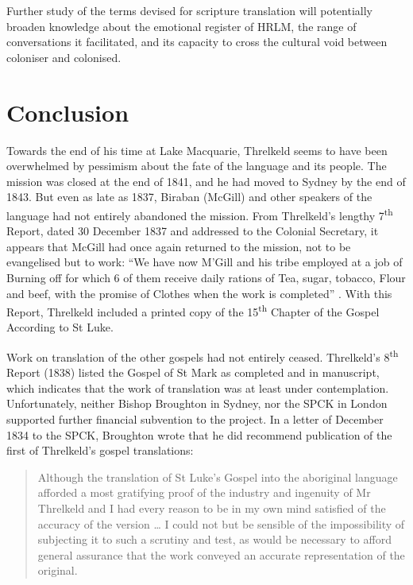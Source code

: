 {Further study of the terms devised for scripture translation will potentially broaden knowledge about the emotional register of HRLM, the range of conversations it facilitated, and its capacity to cross the cultural void between coloniser and colonised.

\section{Conclusion}

Towards the end of his time at Lake Macquarie, Threlkeld seems to have been overwhelmed by pessimism about the fate of the language and its people. The mission was closed at the end of 1841, and he had moved to Sydney by the end of 1843. But even as late as 1837, Biraban (McGill) and other speakers of the language had not entirely abandoned the mission. From Threlkeld’s lengthy 7\textsuperscript{th} Report, dated 30 December 1837 and addressed to the Colonial Secretary, it appears that McGill had once again returned to the mission, not to be evangelised but to work: “We have now M’Gill and his tribe employed at a job of Burning off for which 6 of them receive daily rations of Tea, sugar, tobacco, Flour and beef, with the promise of Clothes when the work is completed” \citep[140]{gunson_australian_1974a}. With this Report, Threlkeld included a printed copy of the 15\textsuperscript{th} Chapter of the Gospel According to St Luke.

Work on translation of the other gospels had not entirely ceased. Threlkeld’s 8\textsuperscript{th} Report (1838) listed the Gospel of St Mark as completed and in manuscript, which indicates that the work of translation was at least under contemplation. Unfortunately, neither Bishop Broughton in Sydney, nor the SPCK in London supported further financial subvention to the project. In a letter of December 1834 to the SPCK, Broughton wrote that he did recommend publication of the first of Threlkeld’s gospel translations:

\begin{quote}
     Although the translation of St Luke’s Gospel into the aboriginal language afforded a most gratifying proof of the industry and ingenuity of Mr Threlkeld and I had every reason to be in my own mind satisfied of the accuracy of the version … I could not but be sensible of the impossibility of subjecting it to such a scrutiny and test, as would be necessary to afford general assurance that the work conveyed an accurate representation of the original. \citep[172, n. 41]{gunson_australian_1974a}
\end{quote}

}
